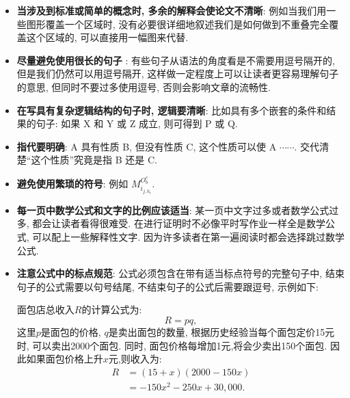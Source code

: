 \documentclass{formatBook}
\begin{document}
\begin{itemize}
    \item {\textbf{当涉及到标准或简单的概念时, 多余的解释会使论文不清晰}}: 例如当我们用一些图形覆盖一个区域时, 没有必要很详细地叙述我们是如何做到不重叠完全覆盖这个区域的, 可以直接用一幅图来代替{.}
    \item {\textbf{尽量避免使用很长的句子} }: 有些句子从语法的角度看是不需要用逗号隔开的, 但是我们仍然可以用逗号隔开, 这样做一定程度上可以让读者更容易理解句子的意思, 但同时不要过多使用逗号, 否则会影响文章的流畅性{.}
    \item {\textbf{在写具有复杂逻辑结构的句子时, 逻辑要清晰}}:  比如具有多个嵌套的条件和结果的句子: 如果 X 和 Y 或 Z 成立, 则可得到 P 或 Q{.}
    \item {\textbf{指代要明确}}: A 具有性质 B, 但没有性质 C, 这个性质可以使 A $\cdots\cdots$. 交代清楚{``}这个性质''究竟是指 B 还是 C{.}
    \item {\textbf{避免使用繁琐的符号}}: 例如 $M_{i_{j, k_{t}}}^{O_{b}^{c}}${.}
    \item {\textbf{每一页中数学公式和文字的比例应该适当}}: 某一页中文字过多或者数学公式过多, 都会让读者看得很难受. 在进行证明时不必像平时写作业一样全是数学公式, 可以配上一些解释性文字. 因为许多读者在第一遍阅读时都会选择跳过数学公式{.}
    \item {\textbf{注意公式中的标点规范}}: 公式必须包含在带有适当标点符号的完整句子中, 结束句子的公式需要以句号结尾, 不结束句子的公式后需要跟逗号, 示例如下: \par
          面包店总收入$R$的计算公式为:
          \begin{equation*}
              R=pq,
          \end{equation*}
          这里$p$是面包的价格, $q$是卖出面包的数量, 根据历史经验当每个面包定价15元时, 可以卖出2000个面包. 同时, 面包价格每增加1元,将会少卖出150个面包. 因此如果面包价格上升$x$元,则收入为:
          \begin{equation*}
              \begin{split}
                  R&=(15+x)(2000-150x)\\
                  &=-150x^{2}-250x+30,000.
              \end{split}
          \end{equation*}

\end{itemize}
\end{document}
